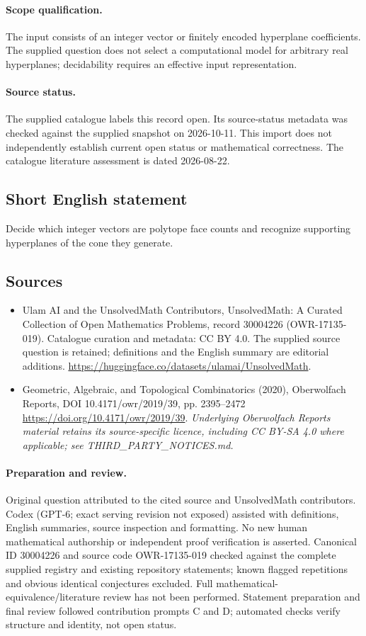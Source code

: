 \documentclass[11pt]{article}
\begin{document}
\paragraph{Scope qualification.}
The input consists of an integer vector or finitely encoded hyperplane coefficients. The supplied question does not select a computational model for arbitrary real hyperplanes; decidability requires an effective input representation.
\paragraph{Source status.}
The supplied catalogue labels this record open. Its source-status metadata was checked against the supplied snapshot on 2026-10-11. This import does not independently establish current open status or mathematical correctness. The catalogue literature assessment is dated 2026-08-22.
\subsection{Short English statement}
Decide which integer vectors are polytope face counts and recognize supporting hyperplanes of the cone they generate.
\subsection{Sources}
\begin{itemize}
\item[S1] Ulam AI and the UnsolvedMath Contributors, UnsolvedMath: A Curated Collection of Open Mathematics Problems, record 30004226 (OWR-17135-019). Catalogue curation and metadata: CC BY 4.0. The supplied source question is retained; definitions and the English summary are editorial additions.
\url{https://huggingface.co/datasets/ulamai/UnsolvedMath}.
\item[S2] Geometric, Algebraic, and Topological Combinatorics (2020), Oberwolfach Reports, DOI 10.4171/owr/2019/39, pp. 2395--2472
\url{https://doi.org/10.4171/owr/2019/39}.
\textit{Underlying Oberwolfach Reports material retains its source-specific licence, including CC BY-SA 4.0 where applicable; see THIRD\_PARTY\_NOTICES.md.}
\end{itemize}
\paragraph{Preparation and review.}
Original question attributed to the cited source and UnsolvedMath contributors. Codex (GPT-6; exact serving revision not exposed) assisted with definitions, English summaries, source inspection and formatting. No new human mathematical authorship or independent proof verification is asserted. Canonical ID 30004226 and source code OWR-17135-019 checked against the complete supplied registry and existing repository statements; known flagged repetitions and obvious identical conjectures excluded. Full mathematical-equivalence/literature review has not been performed. Statement preparation and final review followed contribution prompts C and D; automated checks verify structure and identity, not open status.
\label{end:30004226}
\end{document}
